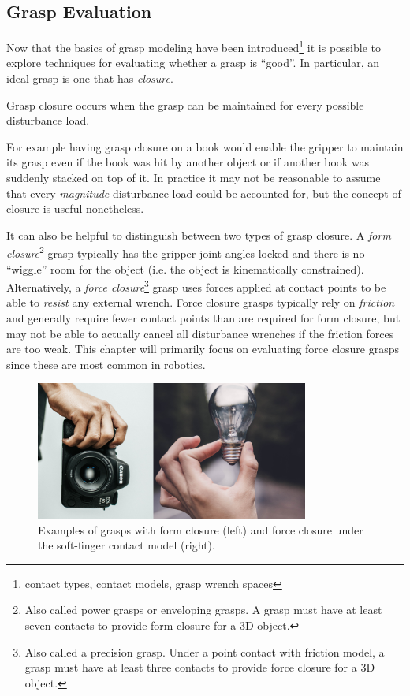 \subsection{Grasp Evaluation} \label{subsec:graspeval}
Now that the basics of grasp modeling have been introduced\footnote{contact types, contact models, grasp wrench spaces} it is possible to explore techniques for evaluating whether a grasp is ``good''. In particular, an ideal grasp is one that has \textit{closure}.
\begin{definition}
Grasp closure occurs when the grasp can be maintained for every possible disturbance load.
\end{definition}
For example having grasp closure on a book would enable the gripper to maintain its grasp even if the book was hit by another object or if another book was suddenly stacked on top of it. In practice it may not be reasonable to assume that every \textit{magnitude} disturbance load could be accounted for, but the concept of closure is useful nonetheless.

It can also be helpful to distinguish between two types of grasp closure. A \textit{form closure}\footnote[][-5\baselineskip]{Also called power grasps or enveloping grasps. A grasp must have at least seven contacts to provide form closure for a 3D object.} grasp typically has the gripper joint angles locked and there is no ``wiggle'' room for the object (i.e. the object is kinematically constrained). Alternatively, a \textit{force closure}\footnote{Also called a precision grasp. Under a point contact with friction model, a grasp must have at least three contacts to provide force closure for a 3D object.} grasp uses forces applied at contact points to be able to \textit{resist} any external wrench. Force closure grasps typically rely on \textit{friction} and generally require fewer contact points than are required for form closure, but may not be able to actually cancel all disturbance wrenches if the friction forces are too weak. This chapter will primarily focus on evaluating force closure grasps since these are most common in robotics.
\begin{figure}[ht]
\begin{center}
\includegraphics[width=0.8\textwidth]{tex/figs/ch26_figs/closure.png}
\caption{Examples of grasps with form closure (left) and force closure under the soft-finger contact model (right).}
\label{fig:closure}
\end{center}
\end{figure}

